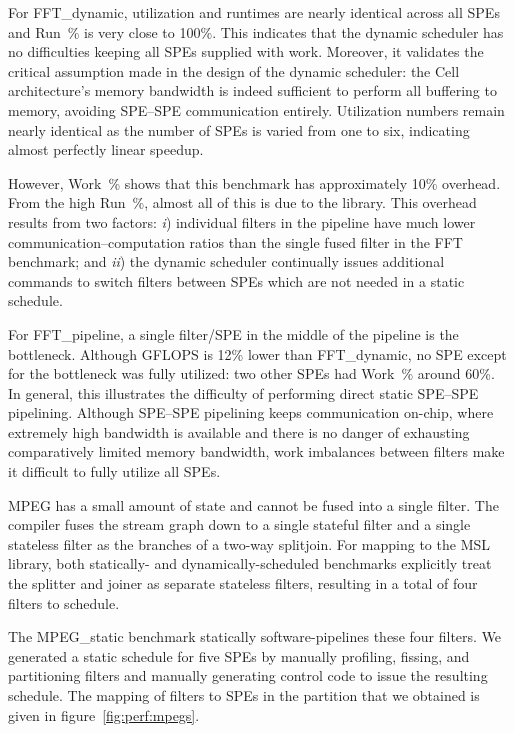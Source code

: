 For \textsf{FFT\_dynamic}, utilization and runtimes are nearly identical across all SPEs and Run~\% is very close to 100\%. This indicates that the dynamic scheduler has no difficulties keeping all SPEs supplied with work. Moreover, it validates the critical assumption made in the design of the dynamic scheduler: the Cell architecture's memory bandwidth is indeed sufficient to perform all buffering to memory, avoiding SPE--SPE communication entirely. Utilization numbers remain nearly identical as the number of SPEs is varied from one to six, indicating almost perfectly linear speedup. 

However, Work~\% shows that this benchmark has approximately 10\% overhead. From the high Run~\%, almost all of this is due to the library. This overhead results from two factors: \emph{i}) individual filters in the pipeline have much lower communication--computation ratios than the single fused filter in the \textsf{FFT} benchmark; and \emph{ii}) the dynamic scheduler continually issues additional commands to switch filters between SPEs which are not needed in a static schedule.

For \textsf{FFT\_pipeline}, a single filter/SPE in the middle of the pipeline is the bottleneck. Although GFLOPS is 12\% lower than \textsf{FFT\_dynamic}, no SPE except for the bottleneck was fully utilized: two other SPEs had Work~\% around 60\%. In general, this illustrates the difficulty of performing direct static SPE--SPE pipelining. Although SPE--SPE pipelining keeps communication on-chip, where extremely high bandwidth is available and there is no danger of exhausting comparatively limited memory bandwidth, work imbalances between filters make it difficult to fully utilize all SPEs.

MPEG has a small amount of state and cannot be fused into a single filter. The compiler fuses the stream graph down to a single stateful filter and a single stateless filter as the branches of a two-way splitjoin. For mapping to the MSL library, both statically- and dynamically-scheduled benchmarks explicitly treat the splitter and joiner as separate stateless filters, resulting in a total of four filters to schedule.

The \textsf{MPEG\_static} benchmark statically software-pipelines these four filters. We generated a static schedule for five SPEs by manually profiling, fissing, and partitioning filters and manually generating control code to issue the resulting schedule. The mapping of filters to SPEs in the partition that we obtained is given in figure~\ref{fig:perf:mpegs}.

